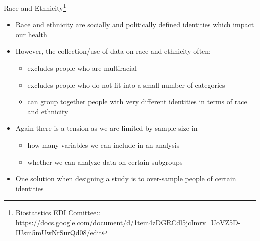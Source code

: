 \documentclass[10pt,t]{beamer}
\begin{document}
\begin{frame}{Race and Ethnicity\footnote{Biostatstics EDI Comittee:: \url{https://docs.google.com/document/d/1tem4zDGRCdl5jcImrv_UoVZ5D-IUsm5mUwNrSurQd08/edit}}}
	\vspace{-7 mm}
	
	\begin{itemize}
		\item Race and ethnicity are socially and politically defined identities which impact our health
		\smallskip
		\item However, the collection/use of data on race and ethnicity often:
		\smallskip
		\begin{itemize}
			\item excludes people who are multiracial
			\medskip
			\item excludes people who do not fit into a small number of categories
			\medskip
			\item can group together people with very different identities in terms of race and ethnicity
			\smallskip
		\end{itemize}
	\item Again there is a tension as we are limited by sample size in
\smallskip
	\begin{itemize}
		\item how many variables we can include in an analysis
		\medskip
		\item whether we can analyze data on certain subgroups
	\end{itemize}
\smallskip
\item One solution when designing a study is to over-sample people of certain identities
	\end{itemize}
\end{frame}
\end{document}
